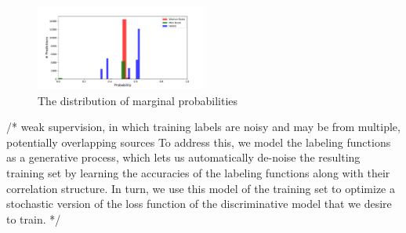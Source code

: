 \begin{figure}[th]
   \includegraphics[width=0.5\textwidth]{resources/genmodel_pred_probs}
   \caption{The distribution of marginal probabilities}
   \label{fig:genmodel_pred_probs}
   \centering
\end{figure}


/*
weak supervision, in which training labels are noisy and may be from
multiple, potentially overlapping sources
To address this, we model the labeling functions as a generative
process, which lets us automatically de-noise the resulting training set by learning the accuracies of
the labeling functions along with their correlation structure. In turn, we use this model of the training
set to optimize a stochastic version of the loss function of the discriminative model that we desire to train. 
*/
